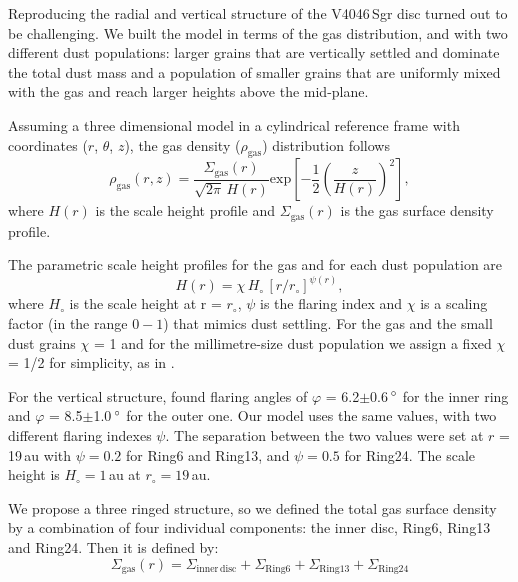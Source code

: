 \documentclass[letters,usenatbib,times]{mnras}
\begin{document}
Reproducing the radial and vertical structure of the V4046\,Sgr disc turned out to be challenging. We built the model in terms of the gas distribution, and with two different dust populations: larger grains that are vertically settled and dominate the total dust mass and a population of smaller grains that are uniformly mixed with the gas and reach larger heights above the mid-plane. 

Assuming a three dimensional model in a cylindrical reference frame with coordinates ($r$, $\theta$, $z$), the gas density ($\rho_{\mathrm{gas}}$) distribution follows
\begin{equation}
  \rho_{\mathrm{gas}}(r,z) =\frac{\Sigma_{\mathrm{gas}}(r)}{\sqrt{2\pi} \, H(r)} \mathrm{exp}\left[-\frac{1}{2} \left(\frac{z}{H(r)}\right)^2\right],
\end{equation}
where $H(r)$ is the scale height profile and $\Sigma_{\mathrm{gas}}(r)$ is the gas surface density profile. 

The parametric scale height profiles for the gas and for each dust population are 
\begin{equation}
    \label{scale}
  H(r)=\chi \, H_{\circ} \, [r/r_{\circ}]^{\psi(r)},
\end{equation}
where $H_\circ$ is the scale height at r = $r_\circ$, $\psi$ is the flaring index and $\chi$ is a scaling factor (in the range $0-1$) that mimics dust settling. For the gas and the small dust grains $\chi$ = 1 and for the millimetre-size dust population we assign a fixed $\chi$ = 1/2 for simplicity, as in \citet{Rosenfeld_2013}.

For the vertical structure, \citet{dOrazi} found flaring angles of $\varphi$ = 6.2$\pm$0.6\,$\hbox{$^\circ$}$ for the inner ring and $\varphi$ = 8.5$\pm$1.0\,$\hbox{$^\circ$}$ for the outer one. Our model uses the same values, with two different flaring indexes $\psi$. The separation between the two values were set at $r$ = 19\,au with $\psi=0.2$ for Ring6 and Ring13, and $\psi=0.5$ for Ring24. The scale height is $H_\circ = 1$\,au at $r_\circ = 19$\,au.

We propose a three ringed structure, so we defined the total gas surface density by a combination of four individual components: the inner disc, Ring6, Ring13 and Ring24. Then it is defined by:
\begin{equation}
  \Sigma_{\mathrm{gas}}(r) = \Sigma_{\mathrm{inner\,disc}} + \Sigma_{\mathrm{Ring6}} + \Sigma_{\mathrm{Ring13}} + \Sigma_{\mathrm{Ring24}}
\end{equation}
\end{document}
